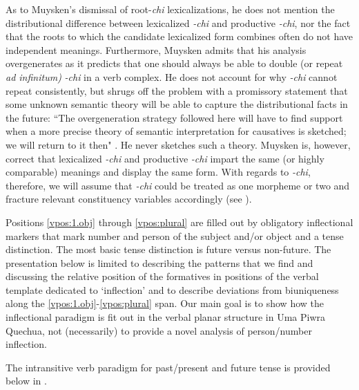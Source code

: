 \documentclass[output=paper]{langscibook}
\begin{document}
As to Muysken's dismissal of root-\textit{chi} lexicalizations, he does not mention the distributional difference between lexicalized \textit{-chi} and productive \textit{-chi}, nor the fact that the roots to which the candidate lexicalized form combines often do not have independent meanings. Furthermore, Muysken admits that his analysis overgenerates as it predicts that one should always be able to double (or repeat \textit{ad infinitum)} \textit{-chi} in a verb complex. He does not account for why \textit{-chi} cannot repeat consistently, but shrugs off the problem with a promissory statement that some unknown semantic theory will be able to capture the distributional facts in the future: ``The overgeneration strategy followed here will have to find support when a more precise theory of semantic interpretation for causatives is sketched; we will return to it then" \citep[297]{muysken:1981}. He never sketches such a theory. Muysken is, however, correct that lexicalized \textit{-chi} and productive \textit{-chi} impart the same (or highly comparable) meanings and display the same form. With regards to \textit{-chi}, therefore, we will assume that \textit{-chi} could be treated as one morpheme or two and fracture relevant constituency variables accordingly (see ).

Positions \ref{vpos:1.obj} through \ref{vpos:plural} are filled out by obligatory inflectional markers that mark number and person of the subject and/or object and a tense distinction. The most basic tense distinction is future versus non-future.  The presentation below is limited to describing the patterns that we find and discussing the relative position of the formatives in positions of the verbal template dedicated to `inflection' and to describe deviations from biuniqueness along the \ref{vpos:1.obj}-\ref{vpos:plural} span. Our main goal is to show how the inflectional paradigm is fit out in the verbal planar structure in Uma Piwra Quechua, not (necessarily) to provide a novel analysis of person/number inflection.

The intransitive verb paradigm for past/present and future tense is provided below in .
\end{document}
